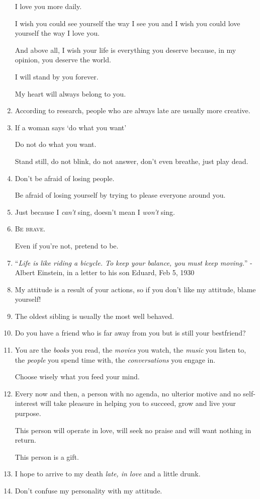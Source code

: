 \documentclass{article}
\begin{document}
\begin{enumerate}
	I love you more daily.
	
	I wish you could see yourself the way I see you and I wish you could love yourself the way I love you.
	
	And above all, I wish your life is everything you deserve because, in my opinion, you deserve the world.
	
	I will stand by you forever.
	
	My heart will always belong to you.
	\item According to research, people who are always late are usually more creative.
	\item If a woman says `do what you want'
	
	Do not do what you want.
	
	Stand still, do not blink, do not answer, don't even breathe, just play dead.
	\item Don't be afraid of losing people.
	
	Be afraid of losing yourself by trying to please everyone around you.
	\item Just because I \textit{can't} sing, doesn't mean I \textit{won't} sing.
	\item \textsc{Be brave}.
	
	Even if you're not, pretend to be.
	\item ``\textit{Life is like riding a bicycle. To keep your balance, you must keep moving.}'' - Albert Einstein, in a letter to his son Eduard, Feb 5, 1930
	\item My attitude is a result of your actions, so if you don't like my attitude, blame yourself!
	\item The oldest sibling is usually the most well behaved.
	\item Do you have a friend who is far away from you but is still your bestfriend?
	\item You are the \textit{books} you read, the \textit{movies} you watch, the \textit{music} you listen to, the \textit{people} you spend time with, the \textit{conversations} you engage in.
	
	Choose wisely what you feed your mind.
	\item Every now and then, a person with no agenda, no ulterior motive and no self-interest will take pleasure in helping you to succeed, grow and live your purpose.
	
	This person will operate in love, will seek no praise and will want nothing in return.
	
	This person is a gift.
	\item I hope to arrive to my death \textit{late, in love} and a little drunk.
	\item Don't confuse my personality with my attitude.
	

\end{enumerate}
\end{document}
